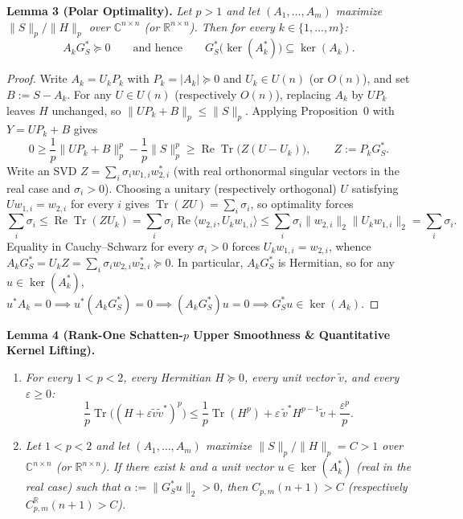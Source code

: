 \documentclass[10pt,letterpaper]{article}
\newcommand{\C}{\mathbb{C}}
\newcommand{\R}{\mathbb{R}}
\newcommand{\Tr}{\operatorname{Tr}}
\begin{document}
\begin{tcolorbox}[lemmabox]
\textbf{Lemma 3 (Polar Optimality).}
\emph{Let $p > 1$ and let $(A_1,\dots,A_m)$ maximize $\|S\|_p / \|H\|_p$ over $\C^{n\times n}$ (or $\R^{n\times n}$). Then for every $k \in \{1,\dots,m\}$:}
\[
  A_k G_S^* \succeq 0 \qquad \text{and hence} \qquad G_S^*\bigl(\ker(A_k^*)\bigr) \subseteq \ker(A_k).
\]
\end{tcolorbox}

\begin{proof}
Write $A_k = U_k P_k$ with $P_k = |A_k| \succeq 0$ and $U_k \in U(n)$ (or $O(n)$), and set $B := S - A_k$. For any $U \in U(n)$ (respectively $O(n)$), replacing $A_k$ by $U P_k$ leaves $H$ unchanged, so $\|U P_k + B\|_p \le \|S\|_p$. Applying Proposition~0 with $Y = U P_k + B$ gives
\[
  0 \ge \frac{1}{p}\|U P_k + B\|_p^p - \frac{1}{p}\|S\|_p^p \ge \operatorname{Re}\Tr\bigl(Z(U - U_k)\bigr),
  \qquad Z := P_k G_S^*.
\]
Write an SVD $Z = \sum_{i} \sigma_i w_{1,i} w_{2,i}^*$ (with real orthonormal singular vectors in the real case and $\sigma_i > 0$). Choosing a unitary (respectively orthogonal) $U$ satisfying $U w_{1,i} = w_{2,i}$ for every $i$ gives $\Tr(Z U) = \sum_i \sigma_i$, so optimality forces
\[
  \sum_i \sigma_i \le \operatorname{Re}\Tr(Z U_k) = \sum_i \sigma_i \operatorname{Re}\langle w_{2,i}, U_k w_{1,i}\rangle \le \sum_i \sigma_i \|w_{2,i}\|_2 \|U_k w_{1,i}\|_2 = \sum_i \sigma_i.
\]
Equality in Cauchy--Schwarz for every $\sigma_i > 0$ forces $U_k w_{1,i} = w_{2,i}$, whence $A_k G_S^* = U_k Z = \sum_i \sigma_i w_{2,i} w_{2,i}^* \succeq 0$. In particular, $A_k G_S^*$ is Hermitian, so for any $u \in \ker(A_k^*)$, $u^* A_k = 0 \implies u^*(A_k G_S^*) = 0 \implies (A_k G_S^*)u = 0 \implies G_S^* u \in \ker(A_k)$.
\end{proof}

\begin{tcolorbox}[lemmabox]
\textbf{Lemma 4 (Rank-One Schatten-$p$ Upper Smoothness \& Quantitative Kernel Lifting).}
\begin{enumerate}[label=(\alph*),leftmargin=1.8em,itemsep=2pt,topsep=2pt]
  \item \emph{For every $1 < p < 2$, every Hermitian $H \succeq 0$, every unit vector $\tilde{v}$, and every $\varepsilon \ge 0$:}
  \[
    \frac{1}{p}\Tr\bigl((H + \varepsilon \tilde{v}\tilde{v}^*)^p\bigr) \le \frac{1}{p}\Tr(H^p) + \varepsilon\,\tilde{v}^* H^{p-1}\tilde{v} + \frac{\varepsilon^p}{p}.
  \]
  \item \emph{Let $1 < p < 2$ and let $(A_1,\dots,A_m)$ maximize $\|S\|_p / \|H\|_p = C > 1$ over $\C^{n\times n}$ (or $\R^{n\times n}$). If there exist $k$ and a unit vector $u \in \ker(A_k^*)$ (real in the real case) such that $\alpha := \|G_S^* u\|_2 > 0$, then $C_{p,m}(n+1) > C$ (respectively $C_{p,m}^{\R}(n+1) > C$).}
\end{enumerate}
\end{tcolorbox}
\end{document}
